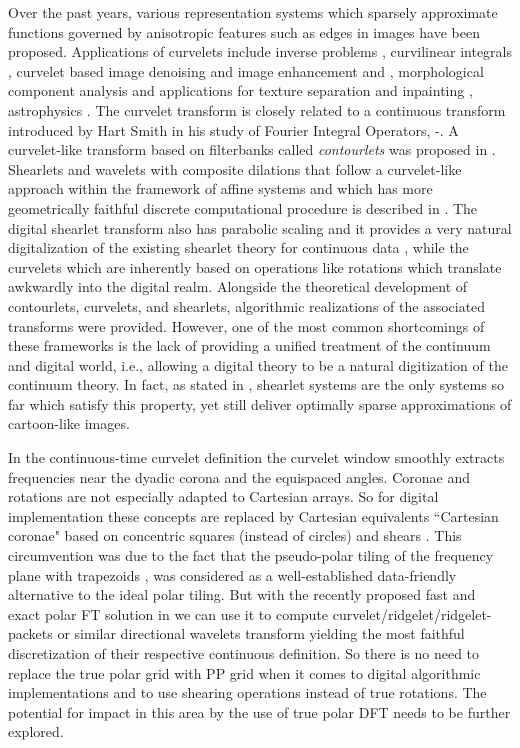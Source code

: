 \documentclass{UCF_ETD}
\begin{document}
Over the past years, various representation systems which sparsely approximate functions governed by anisotropic features such as edges in images have been proposed. Applications of curvelets include inverse problems \cite{Candes2002}, curvilinear integrals \cite{Candes2002}, curvelet based image denoising and image enhancement \cite{Starck2002} and \cite{Chen2007}, morphological component analysis and applications for texture separation and inpainting \cite{Starck2004} , astrophysics \cite{Starck2007}. The curvelet transform is closely related to a continuous transform introduced by Hart Smith in his study of Fourier Integral Operators, \cite{Candes2005}-\cite{Hart_2_1998}. A curvelet-like transform based on filterbanks called \emph{contourlets} was proposed in \cite{Minh2005}. Shearlets and wavelets with composite dilations that follow a curvelet-like approach within the framework of affine systems and which has more geometrically faithful discrete computational procedure is described in \cite{Guo2007}. The digital shearlet transform also has parabolic scaling and it provides a very natural digitalization of the existing shearlet theory for continuous data \cite{Kutyniok2009}, while the curvelets which are inherently based on operations like rotations which translate awkwardly into the digital realm.  Alongside the theoretical development of contourlets, curvelets, and shearlets, algorithmic realizations of the associated transforms were provided. However, one of the most common shortcomings of these frameworks is the lack of providing a unified treatment of the continuum and digital world, i.e., allowing a digital theory to be a natural digitization of the continuum theory. In fact, as stated in \cite{Kutyniok2012}, shearlet systems are the only systems so far which satisfy this property, yet still deliver optimally sparse approximations of cartoon-like images.
 
In the continuous-time curvelet definition the curvelet window smoothly extracts frequencies near the dyadic corona and the equispaced angles. Coronae and rotations are not especially adapted to Cartesian arrays. So for digital implementation these concepts are replaced by Cartesian equivalents ``Cartesian coronae" based on concentric squares (instead of circles) and shears \cite{Candes2006}. This circumvention was due to the fact that the pseudo-polar tiling of the frequency plane with trapezoids \cite{Amir2001}, was considered as a well-established 
data-friendly alternative to the ideal polar tiling. But with the recently proposed fast and exact polar FT solution in \cite{Alam2015} we can use it to compute curvelet/ridgelet/ridgelet-packets or similar directional wavelets transform yielding the most faithful discretization of their respective continuous definition. So there is no need to replace the true polar grid with PP grid when it comes to digital algorithmic implementations and to use shearing operations instead of true rotations. The potential for impact in this area by the use of true polar DFT needs to be further explored. 
\end{document}
